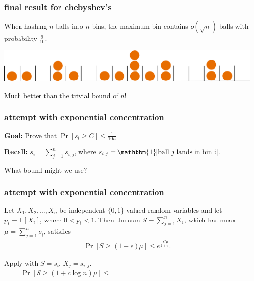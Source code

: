 \documentclass[compress]{beamer}
\newcommand{\E}{\mathbb{E}}
\begin{document}
\begin{frame}
	\frametitle{final result for chebyshev's}
	
	\begin{center}
		When hashing $n$ balls into $n$ bins, the maximum bin contains $o(\sqrt{n})$ balls with probability $\frac{9}{10}$.
		
		\vspace{1em}
		\includegraphics[width=.8\textwidth]{balls_into_bins.png}
		\vspace{1em}
		
		Much better than the trivial bound of $n$! 
	\end{center}
\end{frame}

\begin{frame}[t]
	\frametitle{attempt with exponential concentration}
	\textbf{Goal:} Prove that $\Pr[s_i \geq C] \leq \frac{1}{10n}$. 
	
	\textbf{Recall:} $s_i = \sum_{j=1}^n s_{i,j}$, where $s_{i,j} = \mathbbm{1}[\text{ball $j$ lands in bin $i$}]$.

	\begin{center}
	What bound might we use?
	\end{center}

\end{frame}

\begin{frame}[t]
	\frametitle{attempt with exponential concentration}
	\begin{theorem}
		Let $X_1,X_2,\ldots,X_n$ be independent $\{0,1\}$-valued random variables and let
		$p_i = \E[X_i]$, where $0<p_i<1$.
		Then the sum $S = \sum_{j=1}^{n} X_i$, which has mean
		$\mu = \sum_{j=1}^{n} p_i$, satisfies
		\begin{align*}
			\Pr[S \geq (1+\epsilon)\mu] \leq e^{\frac{-\epsilon^2\mu}{2+ \epsilon}}.
		\end{align*}
	\end{theorem} 
	Apply with $S = s_i$, $X_j = s_{i,j}$.
	\begin{align*}
		\Pr[S \geq (1+c\log n)\mu] \leq \hspace{18em}
	\end{align*}
	
\end{frame}
\end{document}
